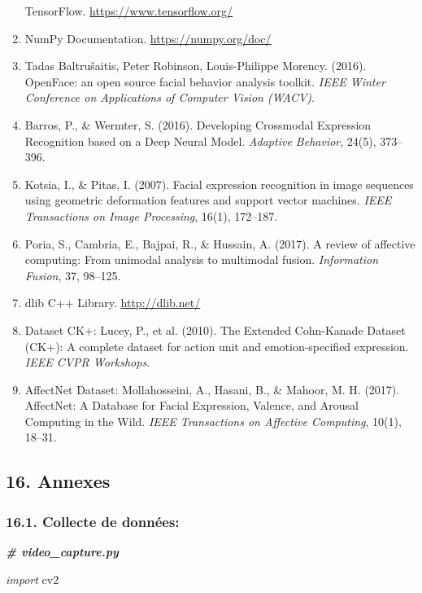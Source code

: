 \documentclass[
]{article}
\begin{document}
\begin{enumerate}
  TensorFlow. \underline{https://www.tensorflow.org/\\
  }
\item
  NumPy Documentation. \underline{https://numpy.org/doc/\\
  }
\item
  Tadas Baltrušaitis, Peter Robinson, Louis-Philippe Morency. (2016). OpenFace: an open source facial behavior analysis toolkit. \emph{IEEE Winter Conference on Applications of Computer Vision (WACV)}.
\item
  Barros, P., \& Wermter, S. (2016). Developing Crossmodal Expression Recognition based on a Deep Neural Model. \emph{Adaptive Behavior}, 24(5), 373--396.
\item
  Kotsia, I., \& Pitas, I. (2007). Facial expression recognition in image sequences using geometric deformation features and support vector machines. \emph{IEEE Transactions on Image Processing}, 16(1), 172--187.
\item
  Poria, S., Cambria, E., Bajpai, R., \& Hussain, A. (2017). A review of affective computing: From unimodal analysis to multimodal fusion. \emph{Information Fusion}, 37, 98--125.
\item
  dlib C++ Library. \underline{http://dlib.net/\\
  }
\item
  Dataset CK+: Lucey, P., et al. (2010). The Extended Cohn-Kanade Dataset (CK+): A complete dataset for action unit and emotion-specified expression. \emph{IEEE CVPR Workshops}.
\item
  AffectNet Dataset: Mollahosseini, A., Hasani, B., \& Mahoor, M. H. (2017). AffectNet: A Database for Facial Expression, Valence, and Arousal Computing in the Wild. \emph{IEEE Transactions on Affective Computing}, 10(1), 18--31.
\end{enumerate}

\hypertarget{annexes}{%
\subsection{16. Annexes}\label{annexes}}

\hypertarget{collecte-de-donnuxe9es}{%
\subsubsection{16.1. Collecte de données:}\label{collecte-de-donnuxe9es}}

\emph{\textbf{\# video\_capture.py}}

\emph{import} cv2
\end{document}
